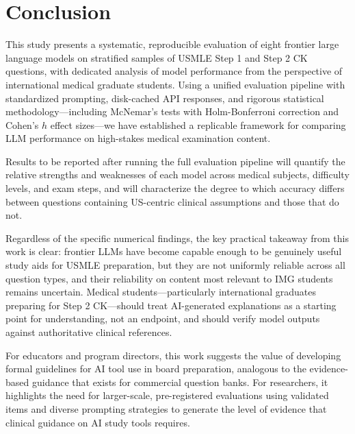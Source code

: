 \section{Conclusion}

This study presents a systematic, reproducible evaluation of eight frontier large language models on stratified samples of USMLE Step 1 and Step 2 CK questions, with dedicated analysis of model performance from the perspective of international medical graduate students. Using a unified evaluation pipeline with standardized prompting, disk-cached API responses, and rigorous statistical methodology—including McNemar's tests with Holm-Bonferroni correction and Cohen's $h$ effect sizes—we have established a replicable framework for comparing LLM performance on high-stakes medical examination content.

Results to be reported after running the full evaluation pipeline will quantify the relative strengths and weaknesses of each model across medical subjects, difficulty levels, and exam steps, and will characterize the degree to which accuracy differs between questions containing US-centric clinical assumptions and those that do not.

Regardless of the specific numerical findings, the key practical takeaway from this work is clear: frontier LLMs have become capable enough to be genuinely useful study aids for USMLE preparation, but they are not uniformly reliable across all question types, and their reliability on content most relevant to IMG students remains uncertain. Medical students—particularly international graduates preparing for Step 2 CK—should treat AI-generated explanations as a starting point for understanding, not an endpoint, and should verify model outputs against authoritative clinical references.

For educators and program directors, this work suggests the value of developing formal guidelines for AI tool use in board preparation, analogous to the evidence-based guidance that exists for commercial question banks. For researchers, it highlights the need for larger-scale, pre-registered evaluations using validated items and diverse prompting strategies to generate the level of evidence that clinical guidance on AI study tools requires.

